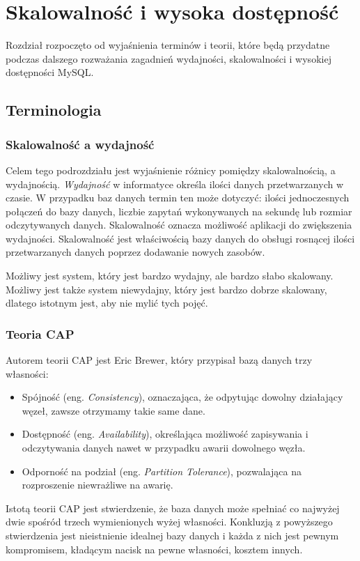 \section{Skalowalność i wysoka dostępność}
Rozdział rozpoczęto od wyjaśnienia terminów i teorii, które będą przydatne podczas dalszego rozważania zagadnień wydajności, skalowalności i wysokiej dostępności MySQL.


\subsection{Terminologia}
\subsubsection{Skalowalność a wydajność}
Celem tego podrozdziału jest wyjaśnienie różnicy pomiędzy skalowalnością, a wydajnością. \textit{Wydajność} w informatyce określa ilości danych przetwarzanych w czasie. W przypadku baz danych termin ten może dotyczyć: ilości jednoczesnych połączeń do bazy danych, liczbie zapytań wykonywanych na sekundę lub rozmiar odczytywanych danych. Skalowalność oznacza możliwość aplikacji do zwiększenia wydajności. Skalowalność jest właściwością bazy danych do obsługi rosnącej ilości przetwarzanych danych poprzez dodawanie nowych zasobów.

Możliwy jest system, który jest bardzo wydajny, ale bardzo słabo skalowany. Możliwy jest także system niewydajny, który jest bardzo dobrze skalowany, dlatego istotnym jest, aby nie mylić tych pojęć.


\subsubsection{Teoria CAP}
Autorem teorii CAP jest Eric Brewer, który przypisał bazą danych trzy własności:
\begin{itemize}
	\item Spójność (eng. \textit{Consistency}), oznaczająca, że odpytując dowolny działający węzeł, zawsze otrzymamy takie same dane.
	\item Dostępność (eng. \textit{Availability}), określająca możliwość zapisywania i odczytywania danych nawet w przypadku awarii dowolnego węzła.
	\item Odporność na podział (eng. \textit{Partition Tolerance}), pozwalająca na rozproszenie niewrażliwe na awarię.
\end{itemize}
Istotą teorii CAP jest stwierdzenie, że baza danych może spełniać co najwyżej dwie spośród trzech wymienionych wyżej własności. Konkluzją z powyższego stwierdzenia jest nieistnienie idealnej bazy danych i każda z nich jest pewnym kompromisem, kładącym nacisk na pewne własności, kosztem innych.

